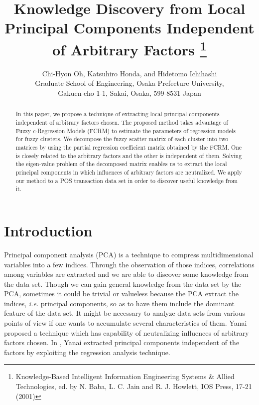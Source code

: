 \documentclass{article}
\begin{document}
\title{Knowledge Discovery from Local Principal Components Independent of Arbitrary Factors
\thanks{Knowledge-Based Intelligent Information Engineering Systems \& Allied Technologies, ed. by N. Baba, L. C. Jain and R. J. Howlett, IOS Press, 17-21 (2001)}
}

\author{Chi-Hyon Oh, Katsuhiro Honda, and Hidetomo Ichihashi\\
 Graduate School of Engineering, Osaka Prefecture University,\\
 Gakuen-cho 1-1, Sakai, Osaka, 599-8531 Japan\\ 
}

\date{}

\maketitle


\begin{abstract}
In this paper, we propose a technique of extracting local principal components independent of arbitrary factors chosen. The proposed method takes advantage of Fuzzy $c$-Regression \mbox{Models} (FCRM) to estimate the parameters of regression models for fuzzy clusters. We decompose the fuzzy scatter matrix of each cluster into two matrices by using the partial regression coefficient matrix obtained by the FCRM. One is closely related to the arbitrary factors and the other is independent of them. Solving the eigen-value problem of the decomposed matrix enables us to extract the local principal components in which influences of arbitrary factors are neutralized. We apply our method to a POS transaction data set in order to discover useful knowledge from it.
\end{abstract}


\section{Introduction} 

Principal component analysis (PCA) is a technique to compress multidimensional variables into a few indices. Through the observation of those indices, correlations among variables are extracted and we are able to discover some knowledge from the data set. Though we can gain general knowledge from the data set by the PCA, sometimes it could be trivial or valueless because the PCA extract the indices, {\it i.e.} principal components, so as to have them include the dominant feature of the data set. It might be necessary to analyze data sets from various points of view if one wants to accumulate several characteristics of them. Yanai \cite{Yanai} proposed a technique which has capability of neutralizing influences of arbitrary factors chosen. In \cite{Yanai}, Yanai extracted principal components independent of the factors by exploiting the regression analysis technique. 
\end{document}
